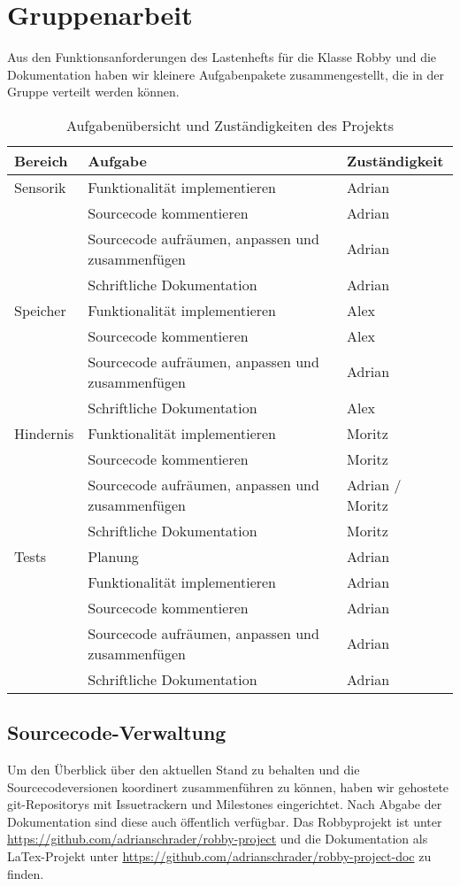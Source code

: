 \section{Gruppenarbeit}
Aus den Funktionsanforderungen des Lastenhefts für die Klasse Robby und die Dokumentation haben wir kleinere Aufgabenpakete zusammengestellt, die in der Gruppe verteilt werden können.

\begin{table*}
    \centering
    \caption{Aufgabenübersicht und Zuständigkeiten des Projekts}
    \begin{tabular}{ l l l }
        \textbf{Bereich} & \textbf{Aufgabe} & \textbf{Zuständigkeit}\\ \hline\hline
        Sensorik & Funktionalität implementieren & Adrian \\
                 & Sourcecode kommentieren & Adrian \\
                 & Sourcecode aufräumen, anpassen und zusammenfügen & Adrian \\
                 & Schriftliche Dokumentation & Adrian \\ \hline
        Speicher & Funktionalität implementieren & Alex \\
                 & Sourcecode kommentieren & Alex \\
                 & Sourcecode aufräumen, anpassen und zusammenfügen & Adrian \\
                 & Schriftliche Dokumentation & Alex \\ \hline
       Hindernis & Funktionalität implementieren & Moritz \\
                 & Sourcecode kommentieren & Moritz \\
                 & Sourcecode aufräumen, anpassen und zusammenfügen & Adrian / Moritz \\
                 & Schriftliche Dokumentation & Moritz \\ \hline
        Tests    & Planung & Adrian \\
                 & Funktionalität implementieren & Adrian \\
                 & Sourcecode kommentieren & Adrian \\
                 & Sourcecode aufräumen, anpassen und zusammenfügen & Adrian \\
                 & Schriftliche Dokumentation & Adrian \\ \hline
    \end{tabular}
\end{table*}

\subsection*{Sourcecode-Verwaltung}
Um den Überblick über den aktuellen Stand zu behalten und die Sourcecodeversionen koordinert zusammenführen zu können, haben wir gehostete git-Repositorys mit Issuetrackern und Milestones eingerichtet. Nach Abgabe der Dokumentation sind diese auch öffentlich verfügbar. Das Robbyprojekt ist unter \url{https://github.com/adrianschrader/robby-project} und die Dokumentation als LaTex-Projekt unter \url{https://github.com/adrianschrader/robby-project-doc} zu finden.
